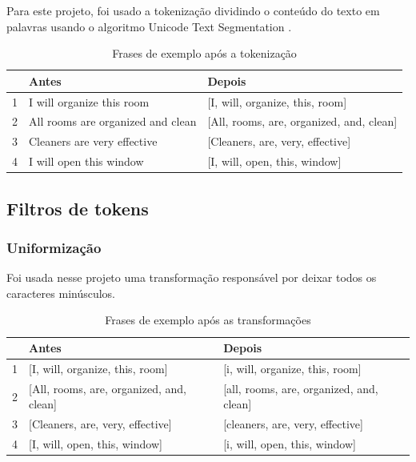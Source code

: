 Para este projeto, foi usado a tokenização dividindo o conteúdo do texto em palavras usando o algoritmo Unicode Text Segmentation \cite{unicodesegmentation}.

\begin{table}[htb]
	\centering
    \def\arraystretch{1.2} %
    \begin{tabular}{|l|l|l|}
        \hline
        & \textbf{Antes} & \textbf{Depois} \\ \hline
        1 & I will organize this room & [I, will, organize, this, room]            \\ \hline
        2 & All rooms are organized and clean & [All, rooms, are, organized, and, clean] \\ \hline
        3 & Cleaners are very effective & [Cleaners, are, very, effective]                              \\ \hline
        4 & I will open this window & [I, will, open, this, window]                             \\ \hline
    \end{tabular}
	\caption{Frases de exemplo após a tokenização}
    \label{tab:tokenization}
\end{table}

\subsection{Filtros de tokens}
\subsubsection{Uniformização}
 Foi usada nesse projeto uma transformação responsável por deixar todos os caracteres minúsculos.

\begin{table}[htb]
	\centering
    \def\arraystretch{1.2} %
    \begin{tabular}{|l|l|l|}
        \hline
        & \textbf{Antes} & \textbf{Depois} \\ \hline
        1 & [I, will, organize, this, room] & [i, will, organize, this, room]            \\ \hline
        2 & [All, rooms, are, organized, and, clean] & [all, rooms, are, organized, and, clean] \\ \hline
        3 & [Cleaners, are, very, effective] & [cleaners, are, very, effective]                              \\ \hline
        4 & [I, will, open, this, window] & [i, will, open, this, window]                             \\ \hline
    \end{tabular}
	\caption{Frases de exemplo após as transformações}
    \label{tab:transformations}
\end{table}

